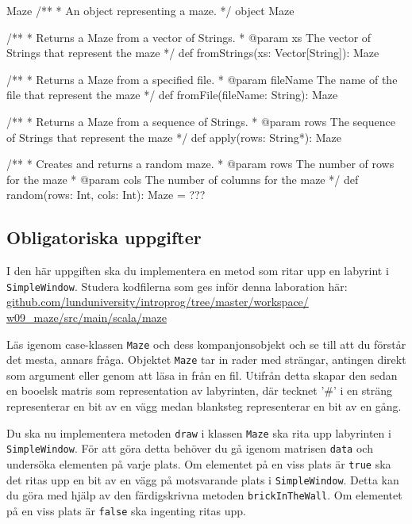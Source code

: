 \begin{ScalaSpec}{Maze}
/**
 *  An object representing a maze.
 */
object Maze {

  /**
   *  Returns a Maze from a vector of Strings.
   *  @param xs	The vector of Strings that represent the maze
   */
  def fromStrings(xs: Vector[String]): Maze

  /**
   *  Returns a Maze from a specified file.
   *  @param fileName	   The name of the file that represent the maze
   */
  def fromFile(fileName: String): Maze

  /**
   *  Returns a Maze from a sequence of Strings.
   *  @param rows	The sequence of Strings that represent the maze
   */
  def apply(rows: String*): Maze

  /**
   *  Creates and returns a random maze.
   *  @param rows		The number of rows for the maze
   *  @param cols		The number of columns for the maze
   */
  def random(rows: Int, cols: Int): Maze = ???
}

\end{ScalaSpec}


\subsection{Obligatoriska uppgifter}

\Task I den här uppgiften ska du implementera en metod som ritar upp en labyrint i \texttt{SimpleWindow}. Studera kodfilerna som ges inför denna laboration här: 
\href{https://github.com/lunduniversity/introprog/tree/master/workspace/w09_maze/src/main/scala/maze}{github.com/lunduniversity/introprog/tree/master/workspace/\\w09\_maze/src/main/scala/maze}

Läs igenom case-klassen \texttt{Maze} och dess kompanjonsobjekt och se till att du förstår det mesta, annars fråga. Objektet \texttt{Maze} tar in rader med strängar, antingen direkt som argument eller genom att läsa in från en fil. Utifrån detta skapar den sedan en booelsk matris som representation av labyrinten, där tecknet '\#' i en sträng representerar en bit av en vägg medan blanksteg representerar en bit av en gång.

\Subtask Du ska nu implementera metoden \texttt{draw} i klassen \texttt{Maze} ska rita upp labyrinten i \texttt{SimpleWindow}. För att göra detta behöver du gå igenom matrisen \texttt{data} och undersöka elementen på varje plats. Om elementet på en viss plats är \texttt{true} ska det ritas upp en bit av en vägg på motsvarande plats i \texttt{SimpleWindow}. Detta kan du göra med hjälp av den färdigskrivna metoden \texttt{brickInTheWall}. Om elementet på en viss plats är \texttt{false} ska ingenting ritas upp.


